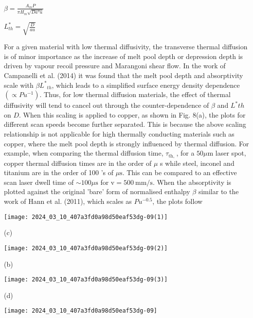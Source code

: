 \documentclass[10pt]{article}
\begin{document}
$\beta=\frac{A_{m} P}{\pi H_{m} \sqrt{D a^{3} u}}$

$L_{t h}^{*}=\sqrt{\frac{D}{a u}}$

For a given material with low thermal diffusivity, the transverse thermal diffusion is of minor importance as the increase of melt pool depth or depression depth is driven by vapour recoil pressure and Marangoni shear flow. In the work of Campanelli et al. (2014) it was found that the melt pool depth and absorptivity scale with $\beta L^{*}{ }_{t h}$, which leads to a simplified surface energy density dependence $\left(\propto P u^{-1}\right)$. Thus, for low thermal diffusion materials, the effect of thermal diffusivity will tend to cancel out through the counter-dependence of $\beta$ and $L^{*} t h$ on $D$. When this scaling is applied to copper, as shown in Fig. 8(a), the plots for different scan speeds become further separated. This is because the above scaling relationship is not applicable for high thermally conducting materials such as copper, where the melt pool depth is strongly influenced by thermal diffusion. For example, when comparing the thermal diffusion time, $\tau_{\text {th, }}$, for a $50 \mu \mathrm{m}$ laser spot, copper thermal diffusion times are in the order of $\mu$ s while steel, inconel and titanium are in the order of 100 's of $\mu \mathrm{s}$. This can be compared to an effective scan laser dwell time of $\sim 100 \mu \mathrm{s}$ for $\mathrm{v}=500 \mathrm{~mm} / \mathrm{s}$. When the absorptivity is plotted against the original 'bare' form of normalised enthalpy $\beta$ similar to the work of Hann et al. (2011), which scales as $P u^{-0.5}$, the plots follow

\begin{center}
\texttt{[image: 2024\_03\_10\_407a3fd0a98d50eaf53dg-09(1)]}
\end{center}

(c)

\begin{center}
\texttt{[image: 2024\_03\_10\_407a3fd0a98d50eaf53dg-09(2)]}
\end{center}

(b)

\begin{center}
\texttt{[image: 2024\_03\_10\_407a3fd0a98d50eaf53dg-09(3)]}
\end{center}

(d)

\begin{center}
\texttt{[image: 2024\_03\_10\_407a3fd0a98d50eaf53dg-09]}
\end{center}
\end{document}
